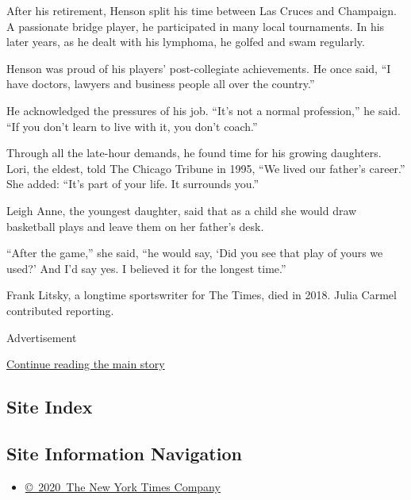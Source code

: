 After his retirement, Henson split his time between Las Cruces and
Champaign. A passionate bridge player, he participated in many local
tournaments. In his later years, as he dealt with his lymphoma, he
golfed and swam regularly.

Henson was proud of his players' post-collegiate achievements. He once
said, ``I have doctors, lawyers and business people all over the
country.''

He acknowledged the pressures of his job. ``It's not a normal
profession,'' he said. ``If you don't learn to live with it, you don't
coach.''

Through all the late-hour demands, he found time for his growing
daughters. Lori, the eldest, told The Chicago Tribune in 1995, ``We
lived our father's career.'' She added: ``It's part of your life. It
surrounds you.''

Leigh Anne, the youngest daughter, said that as a child she would draw
basketball plays and leave them on her father's desk.

``After the game,'' she said, ``he would say, `Did you see that play of
yours we used?' And I'd say yes. I believed it for the longest time.''

Frank Litsky, a longtime sportswriter for The Times, died in 2018. Julia
Carmel contributed reporting.

Advertisement

\protect\hyperlink{after-bottom}{Continue reading the main story}

\hypertarget{site-index}{%
\subsection{Site Index}\label{site-index}}

\hypertarget{site-information-navigation}{%
\subsection{Site Information
Navigation}\label{site-information-navigation}}

\begin{itemize}
\tightlist
\item
  \href{https://help.nytimes.com/hc/en-us/articles/115014792127-Copyright-notice}{©~2020~The
  New York Times Company}
\end{itemize}

